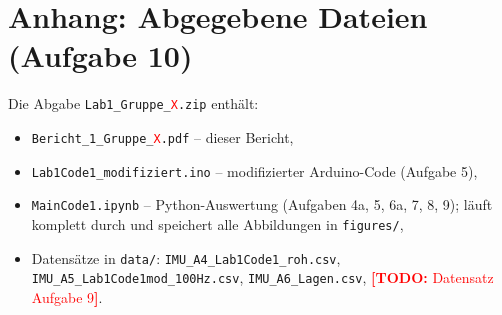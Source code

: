 \documentclass[a4paper,oneside,10pt]{article}
\newcommand{\todo}[1]{\textcolor{red}{\textbf{[TODO:} #1\textbf{]}}}
\def\gruppennr{\textcolor{red}{X}} %
\begin{document}
\appendix
\section{Anhang: Abgegebene Dateien (Aufgabe 10)}
Die Abgabe \texttt{Lab1\_Gruppe\_\gruppennr.zip} enthält:
\begin{itemize}
  \item \texttt{Bericht\_1\_Gruppe\_\gruppennr.pdf} -- dieser Bericht,
  \item \texttt{Lab1Code1\_modifiziert.ino} -- modifizierter Arduino-Code (Aufgabe 5),
  \item \texttt{MainCode1.ipynb} -- Python-Auswertung (Aufgaben 4a, 5, 6a, 7, 8, 9); läuft komplett durch und speichert alle Abbildungen in \texttt{figures/},
  \item Datensätze in \texttt{data/}: \texttt{IMU\_A4\_Lab1Code1\_roh.csv}, \texttt{IMU\_A5\_Lab1Code1mod\_100Hz.csv}, \texttt{IMU\_A6\_Lagen.csv}, \todo{Datensatz Aufgabe 9}.
\end{itemize}
\end{document}
